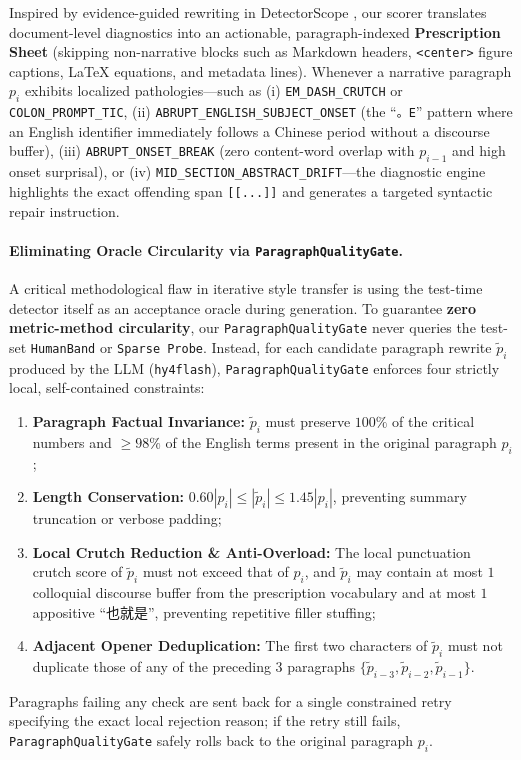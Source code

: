 \documentclass[11pt]{article}
\newcommand{\zh}[1]{#1}
\newcommand{\gate}{\texttt{ParagraphQualityGate}}
\begin{document}
Inspired by evidence-guided rewriting in DetectorScope \cite{detectorscope2026}, our scorer translates document-level diagnostics into an actionable, paragraph-indexed \textbf{Prescription Sheet} (skipping non-narrative blocks such as Markdown headers, \texttt{<center>} figure captions, LaTeX equations, and metadata lines). Whenever a narrative paragraph $p_i$ exhibits localized pathologies---such as (i) \texttt{EM\_DASH\_CRUTCH} or \texttt{COLON\_PROMPT\_TIC}, (ii) \texttt{ABRUPT\_ENGLISH\_SUBJECT\_ONSET} (the ``\texttt{。E}'' pattern where an English identifier immediately follows a Chinese period without a discourse buffer), (iii) \texttt{ABRUPT\_ONSET\_BREAK} (zero content-word overlap with $p_{i-1}$ and high onset surprisal), or (iv) \texttt{MID\_SECTION\_ABSTRACT\_DRIFT}---the diagnostic engine highlights the exact offending span \texttt{[[...]]} and generates a targeted syntactic repair instruction.

\paragraph{Eliminating Oracle Circularity via \gate{}.}
A critical methodological flaw in iterative style transfer is using the test-time detector itself as an acceptance oracle during generation. To guarantee \textbf{zero metric-method circularity}, our \gate{} never queries the test-set \texttt{HumanBand} or \texttt{Sparse Probe}. Instead, for each candidate paragraph rewrite $\tilde{p}_i$ produced by the LLM (\texttt{hy4flash}), \gate{} enforces four strictly local, self-contained constraints:
\begin{enumerate}
    \item \textbf{Paragraph Factual Invariance:} $\tilde{p}_i$ must preserve $100\%$ of the critical numbers and $\ge 98\%$ of the English terms present in the original paragraph $p_i$;
    \item \textbf{Length Conservation:} $0.60 |p_i| \le |\tilde{p}_i| \le 1.45 |p_i|$, preventing summary truncation or verbose padding;
    \item \textbf{Local Crutch Reduction \& Anti-Overload:} The local punctuation crutch score of $\tilde{p}_i$ must not exceed that of $p_i$, and $\tilde{p}_i$ may contain at most $1$ colloquial discourse buffer from the prescription vocabulary and at most $1$ appositive ``\zh{也就是}'', preventing repetitive filler stuffing;
    \item \textbf{Adjacent Opener Deduplication:} The first two characters of $\tilde{p}_i$ must not duplicate those of any of the preceding $3$ paragraphs $\{ \tilde{p}_{i-3}, \tilde{p}_{i-2}, \tilde{p}_{i-1} \}$.
\end{enumerate}
Paragraphs failing any check are sent back for a single constrained retry specifying the exact local rejection reason; if the retry still fails, \gate{} safely rolls back to the original paragraph $p_i$.
\end{document}
